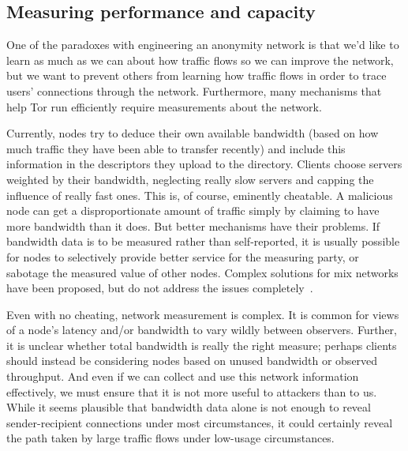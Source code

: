 \documentclass{llncs}
\begin{document}
\subsection{Measuring performance and capacity}
\label{subsec:performance}

One of the paradoxes with engineering an anonymity network is that we'd like
to learn as much as we can about how traffic flows so we can improve the
network, but we want to prevent others from learning how traffic flows in
order to trace users' connections through the network.  Furthermore, many
mechanisms that help Tor run efficiently
require measurements about the network.

Currently, nodes try to deduce their own available bandwidth (based on how
much traffic they have been able to transfer recently) and include this
information in the descriptors they upload to the directory. Clients
choose servers weighted by their bandwidth, neglecting really slow
servers and capping the influence of really fast ones.
%
This is, of course, eminently cheatable.  A malicious node can get a
disproportionate amount of traffic simply by claiming to have more bandwidth
than it does.  But better mechanisms have their problems.  If bandwidth data
is to be measured rather than self-reported, it is usually possible for
nodes to selectively provide better service for the measuring party, or
sabotage the measured value of other nodes.  Complex solutions for
mix networks have been proposed, but do not address the issues
completely~\cite{mix-acc,casc-rep}.

Even with no cheating, network measurement is complex.  It is common
for views of a node's latency and/or bandwidth to vary wildly between
observers.  Further, it is unclear whether total bandwidth is really
the right measure; perhaps clients should instead be considering nodes
based on unused bandwidth or observed throughput.
%
%
And even if we can collect and use this network information effectively,
we must ensure
that it is not more useful to attackers than to us.  While it
seems plausible that bandwidth data alone is not enough to reveal
sender-recipient connections under most circumstances, it could certainly
reveal the path taken by large traffic flows under low-usage circumstances.
\end{document}
